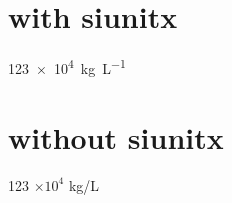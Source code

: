 \documentclass[11pt,dvipdfmx,uplatex]{jsarticle}
\begin{document}
\section*{with siunitx}

\SI[per-mode=symbol]{123e4}{\kilo\gram\per\liter}
\section*{without siunitx}
123 $\times 10^4$ kg/L
\end{document}
